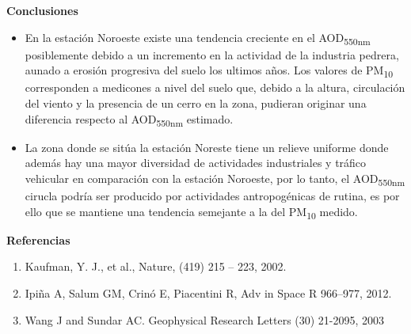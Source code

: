 \documentclass{article}
\begin{document}
\begin{minipage}{0.70\linewidth}
\begin{center}
\begin{shaded}
\textbf{\textcolor{ver}{Conclusiones}}
\end{shaded}
\end{center}
\begin{itemize}
    \item En la estación Noroeste existe una tendencia creciente en el AOD\textsubscript{550nm} posiblemente debido a un incremento en la actividad de la industria
    pedrera, aunado a erosión progresiva del suelo los ultimos años. Los valores de PM\textsubscript{10} corresponden a medicones a nivel del suelo que, debido a la altura,
     circulación del viento y la presencia de un cerro en la zona, pudieran originar una diferencia respecto al AOD\textsubscript{550nm} estimado.
     \item La zona donde se sitúa la estación Noreste tiene un relieve uniforme donde además hay una mayor diversidad de actividades industriales
      y tráfico vehicular en comparación con la estación Noroeste, por lo tanto, el AOD\textsubscript{550nm} 
     cirucla podría ser producido por actividades antropogénicas de rutina, es por ello que se mantiene una tendencia
      semejante a la del PM\textsubscript{10} medido.
\end{itemize}
\end{minipage}
\hspace{0.8cm}
\begin{minipage}{0.25\linewidth}
\vspace*{-0.6cm}
\begin{center}
\begin{shaded}
\textbf{\textcolor{ver}{Referencias}}
\end{shaded}
\end{center}
\begin{enumerate}
    \item Kaufman, Y. J., et al., Nature, (419) 215 – 223, 2002.
    \item Ipiña A, Salum GM, Crinó E, Piacentini R, Adv in Space R 966–977, 2012.
    \item Wang J and Sundar AC. Geophysical Research Letters (30) 21-2095, 2003
\end{enumerate}
\end{minipage}
\end{document}
